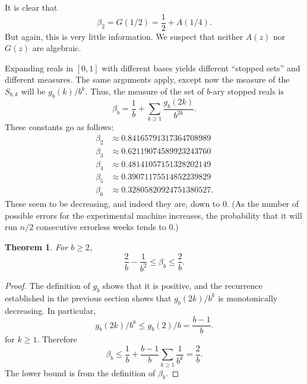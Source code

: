 \documentclass[12pt]{article}
\newtheorem{theorem}{Theorem}
\theoremstyle{definition}
\begin{document}
It is clear that
\begin{equation*}
    \beta_2 = G(1/2) =\frac{1}{2} + A(1/4).
\end{equation*}
But again, this is very little information. We suspect that neither $A(z)$ nor
$G(z)$ are algebraic.

Expanding reals in $[0, 1]$ with different bases yields different ``stopped
sets'' and different measures. The same arguments apply, except now the measure
of the $S_{b,k}$ will be $g_b(k) / b^k$. Thus, the measure of the set of $b$-ary
stopped reals is
\begin{equation*}
    \beta_b = \frac{1}{b} + \sum_{k \geq 1} \frac{g_b(2k)}{b^{2k}}.
\end{equation*}
These constants go as follows:
\begin{align*}
    \beta_2 &\approx 0.84165791317364708989 \\
    \beta_3 &\approx 0.62119074589923243760 \\
    \beta_4 &\approx 0.48141057151328202149 \\
    \beta_5 &\approx 0.39071175514852239829 \\
    \beta_6 &\approx 0.32805820924751380527.
\end{align*}
These seem to be decreasing, and indeed they are, down to 0.
(As the number of possible errors for the experimental machine increases, the probability
that it will run $n/2$ consecutive errorless weeks tends to 0.)

\begin{theorem}
    For $b \geq 2$,
    \begin{equation*}
        \frac{2}{b} - \frac{1}{b^2} \leq \beta_b \leq \frac{2}{b}.
    \end{equation*}
\end{theorem}

\begin{proof}
    The definition of $g_b$ shows that it is positive, and the recurrence
    established in the previous section shows that $g_b(2k) / b^k$ is
    monotonically decreasing. In particular,
    \begin{equation*}
        g_b(2k) / b^k \leq g_b(2) / b = \frac{b - 1}{b}.
    \end{equation*}
    for $k \geq 1$. Therefore
    \begin{equation*}
        \beta_b \leq \frac{1}{b} + \frac{b - 1}{b} \sum_{k \geq 1} \frac{1}{b^k}
        = \frac{2}{b}.
    \end{equation*}
    The lower bound is from the definition of $\beta_b$.
\end{proof}
\end{document}
